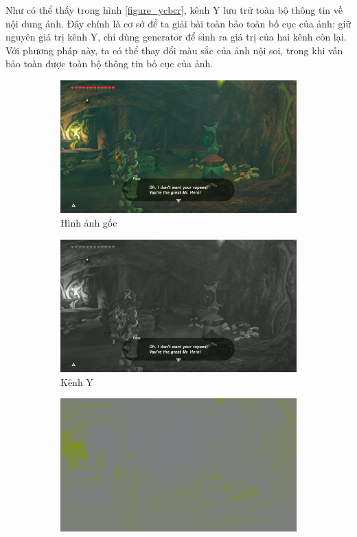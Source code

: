 \documentclass[12pt]{extreport}
\begin{document}
Như có thể thấy trong hình \ref{figure_ycbcr}, kênh Y lưu trữ toàn bộ thông tin về nội dung ảnh. Đây chính là cơ sở để ta giải bài toàn bảo toàn bố cục của ảnh: giữ nguyên giá trị kênh Y, chỉ dùng generator để sinh ra giá trị của hai kênh còn lại. Với phương pháp này, ta có thể thay đổi màu sắc của ảnh nội soi, trong khi vẫn bảo toàn được toàn bộ thông tin bố cục của ảnh.

\begin{figure}[H]
    \centering
    \begin{subfigure}[H]{\textwidth}
        \centering
        \includegraphics[width=0.3\linewidth]{figure29.jpg}
        \caption{Hình ảnh gốc}
    \end{subfigure}
    \begin{subfigure}[H]{0.3\textwidth}
        \centering
        \includegraphics[width=\linewidth]{figure30.png}
        \caption{Kênh Y}
    \end{subfigure}
    \begin{subfigure}[H]{0.3\textwidth}
        \centering
        \includegraphics[width=\linewidth]{figure31.png}

\end{subfigure}
\end{figure}
\end{document}
